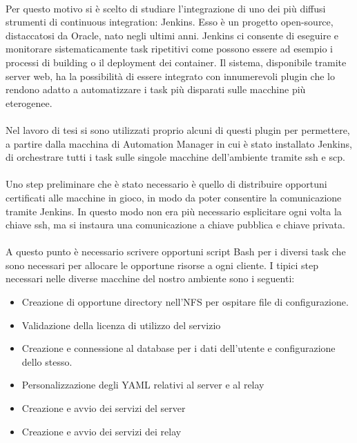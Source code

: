 \paragraph{}
Per questo motivo si è scelto di studiare l'integrazione di uno dei più diffusi strumenti di continuous integration: Jenkins. Esso è un progetto open-source, distaccatosi da Oracle, nato negli ultimi anni. Jenkins ci consente di eseguire e monitorare sistematicamente task ripetitivi come possono essere ad esempio i processi di building o il deployment dei container. Il sistema, disponibile tramite server web, ha la possibilità di essere integrato con innumerevoli plugin che lo rendono adatto a automatizzare i task più disparati sulle macchine più eterogenee. 
\paragraph{}
Nel lavoro di tesi si sono utilizzati proprio alcuni di questi plugin per permettere, a partire dalla macchina di Automation Manager in cui è stato installato Jenkins, di orchestrare tutti i task sulle singole macchine dell'ambiente tramite ssh e scp.
\paragraph{}
Uno step preliminare che è stato necessario è quello di distribuire opportuni certificati alle macchine in gioco, in modo da poter consentire la comunicazione tramite Jenkins. In questo modo non era più necessario esplicitare ogni volta la chiave ssh, ma si instaura una comunicazione a chiave pubblica e chiave privata. 
\paragraph{}
A questo punto è necessario scrivere opportuni script Bash per i diversi task che sono necessari per allocare le opportune risorse a ogni cliente. I tipici step necessari nelle diverse macchine del nostro ambiente sono i seguenti:
\begin{itemize}
	\item Creazione di opportune directory nell'NFS per ospitare file di configurazione.
	\item Validazione della licenza di utilizzo del servizio 
	\item Creazione e connessione al database per i dati dell'utente e configurazione dello stesso.
	\item Personalizzazione degli YAML relativi al server e al relay
	\item Creazione e avvio dei servizi del server
	\item Creazione e avvio dei servizi dei relay
\end{itemize}
